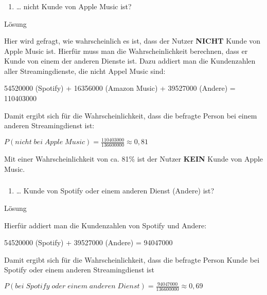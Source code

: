 \documentclass[
  ngerman,
]{book}
\providecommand{\tightlist}{%
  \setlength{\itemsep}{0pt}\setlength{\parskip}{0pt}}
\begin{document}
\hypertarget{section-83}{%
\subsubsection*{}\label{section-83}}

\begin{enumerate}
\def\labelenumi{\alph{enumi})}
\setcounter{enumi}{1}
\tightlist
\item
  \ldots{} nicht Kunde von Apple Music ist?
\end{enumerate}

Lösung

Hier wird gefragt, wie wahrscheinlich es ist, dass der Nutzer \textbf{NICHT} Kunde von Apple Music ist. Hierfür muss man die Wahrscheinlichkeit berechnen, dass er Kunde von einem der anderen Dienste ist. Dazu addiert man die Kundenzahlen aller Streamingdienste, die nicht Appel Music sind:

54520000 (Spotify) + 16356000 (Amazon Music) + 39527000 (Andere) = 110403000

Damit ergibt sich für die Wahrscheinlichkeit, dass die befragte Person bei einem anderen Streamingdienst ist:

\(P(nicht\;bei\;Apple\;Music)=\frac{110403000}{136600000} \approx 0,81\)

Mit einer Wahrscheinlichkeit von ca. 81\% ist der Nutzer \textbf{KEIN} Kunde von Apple Music.

\hypertarget{section-84}{%
\subsubsection*{}\label{section-84}}

\begin{enumerate}
\def\labelenumi{\alph{enumi})}
\setcounter{enumi}{2}
\tightlist
\item
  \ldots{} Kunde von Spotify oder einem anderen Dienst (Andere) ist?
\end{enumerate}

Lösung

Hierfür addiert man die Kundenzahlen von Spotify und Andere:

54520000 (Spotify) + 39527000 (Andere) = 94047000

Damit ergibt sich für die Wahrscheinlichkeit, dass die befragte Person Kunde bei Spotify oder einem anderen Streamingdienst ist

\(P(bei\;Spotify\;oder\;einem\;anderen\;Dienst)=\frac{94047000}{136600000} \approx 0,69\)
\end{document}
